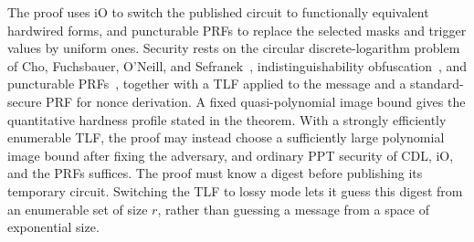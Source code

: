 The proof uses iO to switch the published circuit to functionally equivalent hardwired forms, and puncturable PRFs to replace the selected masks and trigger values by uniform ones. Security rests on the circular discrete-logarithm problem of Cho, Fuchsbauer, O'Neill, and Sefranek~\cite{C:CFOS25}, indistinguishability obfuscation~\cite{C:BGIRSVY01,SIAM:BGIRSVH16,STOC:JaiLinSah21}, and puncturable PRFs~\cite{AC:BonWat13,EC:BoyGilIsh15,CCS:KPTZ13}, together with a TLF applied to the message and a standard-secure PRF for nonce derivation. A fixed quasi-polynomial image bound gives the quantitative hardness profile stated in the theorem. With a strongly efficiently enumerable TLF, the proof may instead choose a sufficiently large polynomial image bound after fixing the adversary, and ordinary PPT security of CDL, iO, and the PRFs suffices. The proof must know a digest before publishing its temporary circuit. Switching the TLF to lossy mode lets it guess this digest from an enumerable set of size $r$, rather than guessing a message from a space of exponential size.

